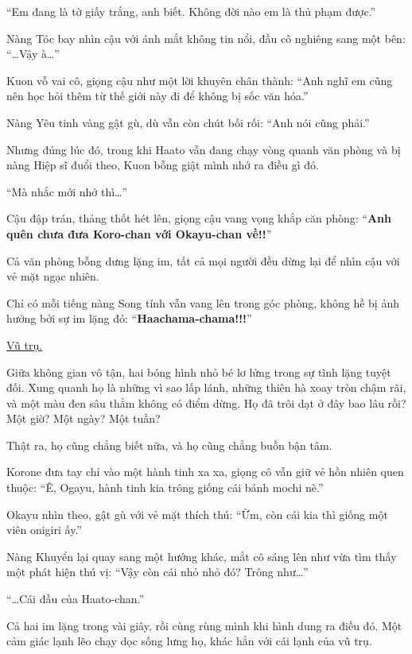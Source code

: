 \documentclass[../main.tex]{subfiles}
\begin{document}
``Em đang là tờ giấy trắng, anh biết. Không đời nào em là thủ phạm được.''

Nàng Tóc bay nhìn cậu với ánh mắt không tin nổi, đầu cô nghiêng sang một bên: ``\dots Vậy à\dots''

Kuon vỗ vai cô, giọng cậu như một lời khuyên chân thành: ``Anh nghĩ em cũng nên học hỏi thêm từ thế giới này đi để không bị sốc văn hóa.''

Nàng Yêu tinh vàng gật gù, dù vẫn còn chút bối rối: ``Anh nói cũng phải.''

Nhưng đúng lúc đó, trong khi Haato vẫn đang chạy vòng quanh văn phòng và bị nàng Hiệp sĩ đuổi theo, Kuon bỗng giật mình nhớ ra điều gì đó.

``Mà nhắc mới nhớ thì\dots''

Cậu đập trán, thảng thốt hét lên, giọng cậu vang vọng khắp căn phòng: ``\textbf{Anh quên chưa đưa Koro-chan với Okayu-chan về!!}''

Cả văn phòng bỗng dưng lặng im, tất cả mọi người đều dừng lại để nhìn cậu với vẻ mặt ngạc nhiên.

Chỉ có mỗi tiếng nàng Song tính vẫn vang lên trong góc phòng, không hề bị ảnh hưởng bởi sự im lặng đó: ``\textbf{Haachama-chama!!!}''

\begin{center}
  \uline{Vũ trụ.}
\end{center}

Giữa không gian vô tận, hai bóng hình nhỏ bé lơ lửng trong sự tĩnh lặng tuyệt đối. Xung quanh họ là những vì sao lấp lánh, những thiên hà xoay tròn chậm rãi, và một màu đen sâu thẳm không có điểm dừng. Họ đã trôi dạt ở đây bao lâu rồi? Một giờ? Một ngày? Một tuần?

Thật ra, họ cũng chẳng biết nữa, và họ cũng chẳng buồn bận tâm.

Korone đưa tay chỉ vào một hành tinh xa xa, giọng cô vẫn giữ vẻ hồn nhiên quen thuộc: ``Ê, Ogayu, hành tinh kia trông giống cái bánh mochi nè.''

Okayu nhìn theo, gật gù với vẻ mặt thích thú: ``Ừm, còn cái kia thì giống một viên onigiri ấy.''

Nàng Khuyển lại quay sang một hướng khác, mắt cô sáng lên như vừa tìm thấy một phát hiện thú vị: ``Vậy còn cái nhỏ nhỏ đó? Trông như\dots''

``\dots Cái đầu của Haato-chan.''

Cả hai im lặng trong vài giây, rồi cùng rùng mình khi hình dung ra điều đó. Một cảm giác lạnh lẽo chạy dọc sống lưng họ, khác hẳn với cái lạnh của vũ trụ.
\end{document}
